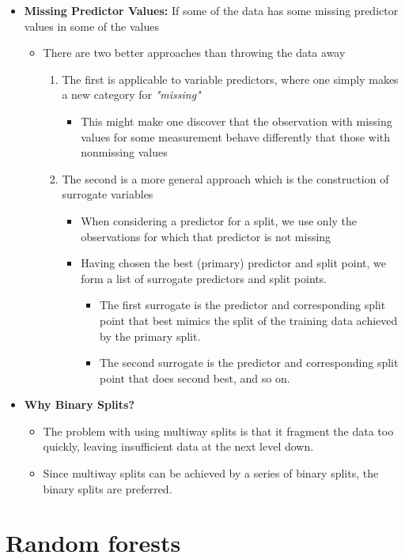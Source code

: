 \documentclass[11pt]{article}
\begin{document}
\begin{itemize}
\item \textbf{Missing Predictor Values:} If some of the data has some missing predictor values in some of the values
\begin{itemize}
\item There are two better approaches than throwing the data away
\begin{enumerate}
\item The first is applicable to variable predictors, where one simply makes a new category for \emph{"missing"}
\begin{itemize}
\item This might make one discover that the observation with missing values for some measurement behave differently that those with nonmissing values
\end{itemize}
\item The second is a more general approach which is the construction of surrogate variables
\begin{itemize}
\item When considering a predictor for a split, we use only the observations for which that predictor is not missing
\item Having chosen the best (primary) predictor and split point, we form a list of surrogate predictors and split points.
\begin{itemize}
\item The first surrogate is the predictor and corresponding split point that best mimics the split of the training data achieved by the primary split.
\item The second surrogate is the predictor and corresponding split point that does second best, and so on.
\end{itemize}
\end{itemize}
\end{enumerate}
\end{itemize}

\item \textbf{Why Binary Splits?}
\begin{itemize}
\item The problem with using multiway splits is that it fragment the data too quickly, leaving insufficient data at the next level down.
\item Since multiway splits can be achieved by a series of binary splits, the binary splits are preferred.
\end{itemize}
\end{itemize}

\section{Random forests}
\label{sec:org36cc86c}
\end{document}
